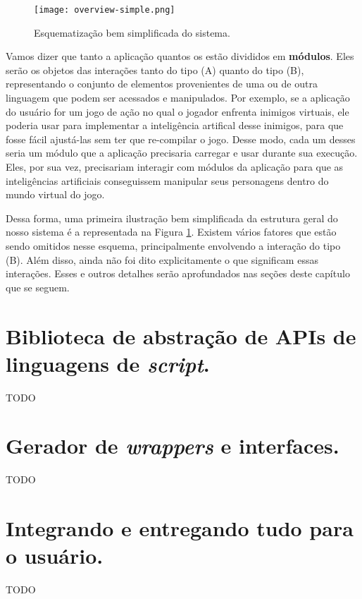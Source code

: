     \begin{figure}[ht]
      \centering
      \texttt{[image: overview-simple.png]}
      \caption{Esquematização bem simplificada do sistema.}
      \label{fig:overview-simple}
    \end{figure}

    Vamos dizer que tanto a aplicação quantos os  estão divididos
    em \textbf{módulos}. Eles serão os objetos das interações tanto do tipo (A)
    quanto do tipo (B), representando o conjunto de elementos provenientes de
    uma ou de outra linguagem que podem ser acessados e manipulados. Por
    exemplo, se a aplicação do usuário for um jogo de ação no qual o jogador
    enfrenta inimigos virtuais, ele poderia usar  para implementar a
    inteligência artifical desse inimigos, para que fosse fácil ajustá-las sem
    ter que re-compilar o jogo. Desse modo, cada um desses  seria um
    módulo que a aplicação precisaria carregar e usar durante sua execução.
    Eles, por sua vez, precisariam interagir com módulos da aplicação para que
    as inteligências artificiais conseguissem manipular seus personagens dentro
    do mundo virtual do jogo.

    Dessa forma, uma primeira ilustração bem simplificada da estrutura geral do
    nosso sistema é a representada na Figura \ref{fig:overview-simple}. Existem
    vários fatores que estão sendo omitidos nesse esquema, principalmente
    envolvendo a interação do tipo (B). Além disso, ainda não foi dito
    explicitamente o que significam essas interações. Esses e outros detalhes
    serão aprofundados nas seções deste capítulo que se seguem.

  \section{Biblioteca de abstração de APIs de linguagens de \emph{script}.}
  \label{sec:estrutura:opa}
  TODO
  
  \section{Gerador de \emph{wrappers} e interfaces.}
  \label{sec:estrutura:opwig}
  TODO
  
  \section{Integrando e entregando tudo para o usuário.}
  \label{sec:estrutura:integration}
  TODO

